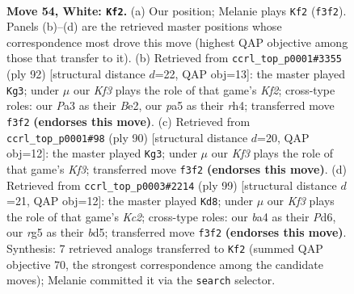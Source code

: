 \documentclass[11pt]{article}
\begin{document}
\clearpage

\begin{figure}[p]\centering
\begin{subfigure}{0.46\textwidth}\centering
\resizebox{\linewidth}{!}{%
\newchessgame
\chessboard[
  setfen={4k3/8/1R6/pp4r1/b1p5/P1P2K2/1B6/8 w - - 14 54},
  showmover=false,
  pgfstyle=straightmove, color=movearrow, markmove={f3-f2}
]}
\caption{}
\end{subfigure}\hfill
\begin{subfigure}{0.46\textwidth}\centering
\resizebox{\linewidth}{!}{%
\newchessgame
\chessboard[
  setfen={8/1p6/6k1/PPR2p2/4b2r/8/4BK2/8 w - - 0 47},
  showmover=false,
  pgfstyle=straightmove, color=movearrow, markmove={f2-g3}
]}
\caption{}
\end{subfigure}
\\[4pt]
\begin{subfigure}{0.46\textwidth}\centering
\resizebox{\linewidth}{!}{%
\newchessgame
\chessboard[
  setfen={8/2kp4/8/r4p2/1p3P2/1Bb2K2/P7/3R4 w - - 19 46},
  showmover=false,
  pgfstyle=straightmove, color=movearrow, markmove={f3-g3}
]}
\caption{}
\end{subfigure}\hfill
\begin{subfigure}{0.46\textwidth}\centering
\resizebox{\linewidth}{!}{%
\newchessgame
\chessboard[
  setfen={8/2k5/3p1p2/p2B4/4PPK1/1P6/P2b4/8 b - - 15 50},
  showmover=false,
  pgfstyle=straightmove, color=movearrow, markmove={c7-d8}
]}
\caption{}
\end{subfigure}
\caption{\textbf{Move 54, White: \texttt{Kf2}.} (a) Our position; Melanie plays \texttt{Kf2} (\texttt{f3f2}). Panels (b)--(d) are the retrieved master positions whose correspondence most drove this move (highest QAP objective among those that transfer to it). (b) Retrieved from \texttt{ccrl\_top\_p0001\#3355} (ply 92) [structural distance $d$=22, QAP obj=13]: the master played \texttt{Kg3}; under $\mu$ our \emph{Kf3} plays the role of that game's \emph{Kf2}; cross-type roles: our \emph{P}a3 as their \emph{B}e2, our \emph{p}a5 as their \emph{r}h4; transferred move \texttt{f3f2} \textbf{(endorses this move)}. (c) Retrieved from \texttt{ccrl\_top\_p0001\#98} (ply 90) [structural distance $d$=20, QAP obj=12]: the master played \texttt{Kg3}; under $\mu$ our \emph{Kf3} plays the role of that game's \emph{Kf3}; transferred move \texttt{f3f2} \textbf{(endorses this move)}. (d) Retrieved from \texttt{ccrl\_top\_p0003\#2214} (ply 99) [structural distance $d$=21, QAP obj=12]: the master played \texttt{Kd8}; under $\mu$ our \emph{Kf3} plays the role of that game's \emph{Kc2}; cross-type roles: our \emph{b}a4 as their \emph{P}d6, our \emph{r}g5 as their \emph{b}d5; transferred move \texttt{f3f2} \textbf{(endorses this move)}. Synthesis: 7 retrieved analogs transferred to \texttt{Kf2} (summed QAP objective 70, the strongest correspondence among the candidate moves); Melanie committed it via the \texttt{search} selector.}
\label{fig:thought-m106}
\end{figure}
\end{document}

